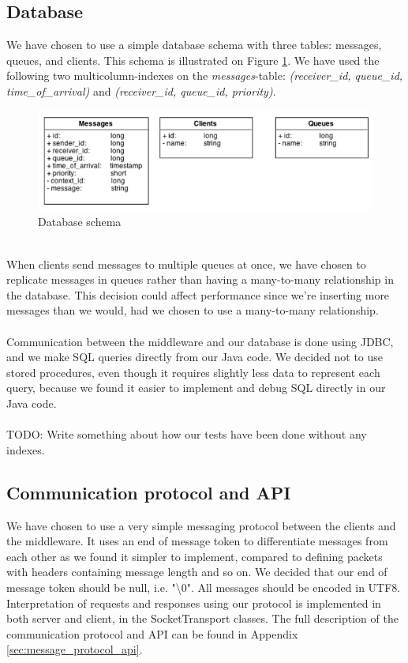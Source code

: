 \documentclass{article}
\begin{document}
        \subsection{Database}
            We have chosen to use a simple database schema with three tables: messages, queues, and clients. This schema is illustrated on Figure \ref{fig:database_schema}. We have used the following two multicolumn-indexes on the \textit{messages}-table: \textit{(receiver\_id, queue\_id, time\_of\_arrival)} and \textit{(receiver\_id, queue\_id, priority)}. 
            \begin{figure}[H]
                \centering
                \includegraphics[scale=0.50]{database_schema}
                \caption{Database schema}
                \label{fig:database_schema}
            \end{figure}
            ~\\
            When clients send messages to multiple queues at once, we have chosen to replicate messages in queues rather than having a many-to-many relationship in the database. This decision could affect performance since we're inserting more messages than we would, had we chosen to use a many-to-many relationship.\\
            \\
            Communication between the middleware and our database is done using JDBC, and we make SQL queries directly from our Java code. We decided not to use stored procedures, even though it requires slightly less data to represent each query, because we found it easier to implement and debug SQL directly in our Java code.\\
            \\
            TODO: Write something about how our tests have been done without any indexes.

        \subsection{Communication protocol and API}
            We have chosen to use a very simple messaging protocol between the clients and the middleware. It uses an end of message token to differentiate messages from each other as we found it simpler to implement, compared to defining packets with headers containing message length and so on. We decided that our end of message token should be null, i.e. "\textbackslash0". All messages should be encoded in UTF8.\\
            Interpretation of requests and responses using our protocol is implemented in both server and client, in the SocketTransport classes. The full description of the communication protocol and API can be found in Appendix \ref{sec:message_protocol_api}.
\end{document}
